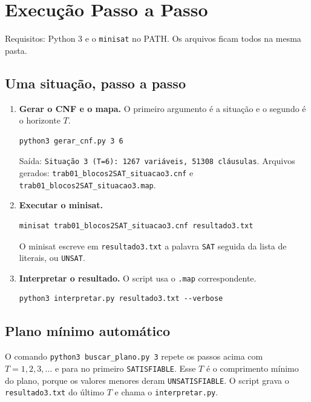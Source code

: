 \section{Execução Passo a Passo}\label{sec:resultados}

Requisitos: Python 3 e o \texttt{minisat} no PATH. Os arquivos ficam todos na mesma pasta.

\subsection{Uma situação, passo a passo}
\begin{enumerate}
\item \textbf{Gerar o CNF e o mapa.} O primeiro argumento é a situação e o segundo é o horizonte $T$.
\begin{lstlisting}
python3 gerar_cnf.py 3 6
\end{lstlisting}
Saída: \texttt{Situação 3 (T=6): 1267 variáveis, 51308 cláusulas}. Arquivos gerados: \texttt{trab01\_blocos2SAT\_situacao3.cnf} e \texttt{trab01\_blocos2SAT\_situacao3.map}.
\item \textbf{Executar o minisat.}
\begin{lstlisting}
minisat trab01_blocos2SAT_situacao3.cnf resultado3.txt
\end{lstlisting}
O minisat escreve em \texttt{resultado3.txt} a palavra \texttt{SAT} seguida da lista de literais, ou \texttt{UNSAT}.
\item \textbf{Interpretar o resultado.} O script usa o \texttt{.map} correspondente.
\begin{lstlisting}
python3 interpretar.py resultado3.txt --verbose
\end{lstlisting}
\end{enumerate}

\subsection{Plano mínimo automático}
O comando \texttt{python3 buscar\_plano.py 3} repete os passos acima com $T=1,2,3,\dots$ e para no primeiro \texttt{SATISFIABLE}. Esse $T$ é o comprimento mínimo do plano, porque os valores menores deram \texttt{UNSATISFIABLE}. O script grava o \texttt{resultado3.txt} do último $T$ e chama o \texttt{interpretar.py}.

